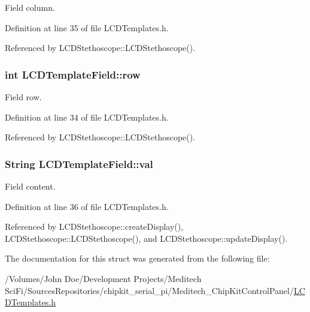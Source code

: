Field column. 



Definition at line 35 of file L\-C\-D\-Templates.\-h.



Referenced by L\-C\-D\-Stethoscope\-::\-L\-C\-D\-Stethoscope().

\hypertarget{struct_l_c_d_template_field_a842db0224937e139c4ff9f9a6da123e6}{
\subsubsection[{row}]{\setlength{\rightskip}{0pt plus 5cm}int L\-C\-D\-Template\-Field\-::row}}\label{struct_l_c_d_template_field_a842db0224937e139c4ff9f9a6da123e6}


Field row. 



Definition at line 34 of file L\-C\-D\-Templates.\-h.



Referenced by L\-C\-D\-Stethoscope\-::\-L\-C\-D\-Stethoscope().

\hypertarget{struct_l_c_d_template_field_a6eb7ce0547fc28ac3a2538f0fac3f117}{
\subsubsection[{val}]{\setlength{\rightskip}{0pt plus 5cm}String L\-C\-D\-Template\-Field\-::val}}\label{struct_l_c_d_template_field_a6eb7ce0547fc28ac3a2538f0fac3f117}


Field content. 



Definition at line 36 of file L\-C\-D\-Templates.\-h.



Referenced by L\-C\-D\-Stethoscope\-::create\-Display(), L\-C\-D\-Stethoscope\-::\-L\-C\-D\-Stethoscope(), and L\-C\-D\-Stethoscope\-::update\-Display().



The documentation for this struct was generated from the following file\-:\begin{DoxyCompactItemize}
\item 
/\-Volumes/\-John Doe/\-Development Projects/\-Meditech Sci\-Fi/\-Sources\-Repositories/chipkit\-\_\-serial\-\_\-pi/\-Meditech\-\_\-\-Chip\-Kit\-Control\-Panel/\hyperlink{_l_c_d_templates_8h}{L\-C\-D\-Templates.\-h}\end{DoxyCompactItemize}
